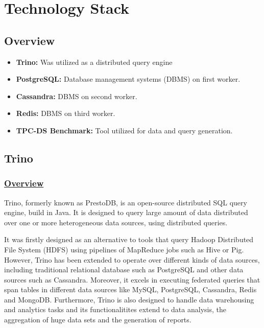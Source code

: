\documentclass[conference]{IEEEtran}
\begin{document}
\section{Technology Stack}

\subsection{Overview}

\begin{itemize}
    \item \textbf{Trino:} Was utilized as a distributed query engine
    \item \textbf{PostgreSQL:} Database management systems (DBMS) on first worker.
    \item \textbf{Cassandra:} DBMS on second worker.
    \item \textbf{Redis:} DBMS on third worker.
    \item \textbf{TPC-DS Benchmark:} Tool utilized for data and query generation.
\end{itemize}

\subsection{Trino}

\subsubsection{\textbf{\underline{Overview}}}
Trino, formerly known as PrestoDB, is an open-source distributed SQL query engine, build in Java. It is designed to query large amount of data
distributed over one or more heterogeneous data sources, using distributed queries.

It was firstly designed as an alternative to tools that query Hadoop Distributed File System (HDFS) using pipelines of MapReduce jobs such as Hive 
or Pig. However, Trino has been extended to operate over different kinds of data sources, including traditional relational database such as PostgreSQL 
and other data sources such as Cassandra. Moreover, it excels in executing federated queries that span tables in different data sources like MySQL, PostgreSQL, Cassandra, Redis and MongoDB.
Furthermore, Trino is also designed to handle data warehousing and analytics tasks and its functionalitites extend to data analysis, the aggregation of huge
data sets and the generation of reports.
\end{document}

